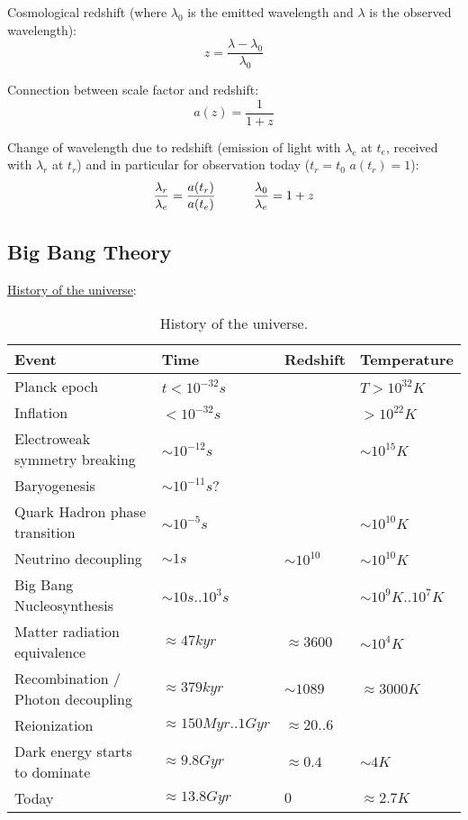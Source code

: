		\noindent
		Cosmological redshift (where $\lambda_0$ is the emitted wavelength and $\lambda$ is the observed wavelength):
		\begin{equation}
			z = \frac{\lambda - \lambda_0}{\lambda_0}
		\end{equation}

		\noindent
		Connection between scale factor and redshift:
		\begin{equation}
			a(z) = \frac{1}{1+z}
		\end{equation}

		\noindent
		Change of wavelength due to redshift (emission of light with $\lambda_e$ at $t_e$, received with $\lambda_r$ at $t_r$) and in particular for observation today ($t_r=t_0$ \ie $a(t_r)=1$):
		\begin{equation}
			\frac{\lambda_r}{\lambda_e} = \frac{a(t_r)}{a(t_e)}
			\hspace{30pt}
			\frac{\lambda_0}{\lambda_e} = 1+z
		\end{equation}

	\subsection{Big Bang Theory}
		\noindent
		\href{https://en.wikipedia.org/wiki/Chronology_of_the_universe#Tabular_summary}{History of the universe}:
		\begin{table}[ht]
			\begin{center}
				\begin{tabular}{ l | l | l | l }
					Event & Time & Redshift & Temperature \\ \hline
					Planck epoch & $t < 10^{-32}\unit{s}$ & & $T>10^{32}\unit{K}$ \\
					Inflation & $< 10^{-32}\unit{s}$ & & $>10^{22}\unit{K}$ \\
					Electroweak symmetry breaking & $\sim 10^{-12}\unit{s}$ & & $\sim10^{15}\unit{K}$ \\
					Baryogenesis & $\sim 10^{-11}\unit{s}$? & & \\
					Quark Hadron phase transition & $\sim 10^{-5}\unit{s}$ & & $\sim 10^{10}\unit{K}$ \\
					Neutrino decoupling & $\sim 1\unit{s}$ & $\sim 10^{10}$ & $\sim 10^{10}\unit{K}$ \\
					Big Bang Nucleosynthesis & $\sim 10 \unit{s}..10^3\unit{s}$ & & $\sim 10^9\unit{K}..10^7\unit{K}$ \\
					Matter radiation equivalence & $\approx 47\unit{kyr}$ & $\approx 3600$ & $\sim 10^4\unit{K}$ \\
					Recombination / Photon decoupling & $\approx 379\unit{kyr}$ & $\sim 1089$ & $\approx 3000\unit{K}$ \\
					Reionization & $\approx 150\unit{Myr}..1\unit{Gyr}$ & $\approx 20..6$ &  \\
					Dark energy starts to dominate & $\approx 9.8\unit{Gyr}$ & $\approx 0.4$ & $\sim 4\unit{K}$ \\
					Today & $\approx 13.8\unit{Gyr}$ & $0$ & $\approx 2.7\unit{K}$ \\
				\end{tabular}
				\caption{History of the universe.}
			\end{center}
		\end{table}

